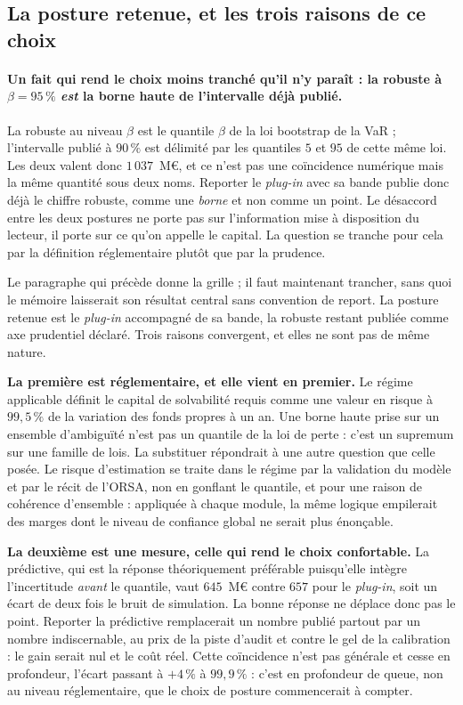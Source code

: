 \subsection*{La posture retenue, et les trois raisons de ce choix}
\label{sec:posture-retenue}


\paragraph{Un fait qui rend le choix moins tranché qu'il n'y paraît : la robuste à
$\beta=95\,\%$ \emph{est} la borne haute de l'intervalle déjà publié.} La robuste au niveau
$\beta$ est le quantile $\beta$ de la loi bootstrap de la VaR ; l'intervalle publié à $90\,\%$ est
délimité par les quantiles $5$ et $95$ de cette même loi. Les deux valent donc $1\,037$~M\euro{},
et ce n'est pas une coïncidence numérique mais la même quantité sous deux noms. Reporter le
\emph{plug-in} avec sa bande publie donc déjà le chiffre robuste, comme une \emph{borne} et non
comme un point. Le désaccord entre les deux postures ne porte pas sur l'information mise à
disposition du lecteur, il porte sur ce qu'on appelle \og le \fg{} capital. La question se tranche
pour cela par la définition réglementaire plutôt que par la prudence.

Le paragraphe qui précède donne la grille ; il faut maintenant trancher, sans quoi le mémoire
laisserait son résultat central sans convention de report. La posture retenue est le
\emph{plug-in} accompagné de sa bande, la robuste restant publiée comme axe prudentiel déclaré.
Trois raisons convergent, et elles ne sont pas de même nature.

\textbf{La première est réglementaire, et elle vient en premier.} Le régime applicable définit le
capital de solvabilité requis comme une valeur en risque à $99{,}5\,\%$ de la variation des fonds
propres à un an. Une borne haute prise sur un ensemble d'ambiguïté n'est pas un quantile de la loi
de perte : c'est un supremum sur une famille de lois. La substituer répondrait à une autre question
que celle posée. Le risque d'estimation se traite dans le régime par la validation du modèle et par
le récit de l'ORSA, non en gonflant le quantile, et pour une raison de cohérence d'ensemble :
appliquée à chaque module, la même logique empilerait des marges dont le niveau de confiance global
ne serait plus énonçable.

\textbf{La deuxième est une mesure, celle qui rend le choix confortable.} La prédictive,
qui est la réponse théoriquement préférable puisqu'elle intègre l'incertitude \emph{avant} le
quantile, vaut $645$~M\euro{} contre $657$ pour le \emph{plug-in}, soit un écart de deux fois le
bruit de simulation. La bonne réponse ne déplace donc pas le point. Reporter la
prédictive remplacerait un nombre publié partout par un nombre indiscernable, au prix de la piste
d'audit et contre le gel de la calibration : le gain serait nul et le coût réel. Cette
coïncidence n'est pas générale et cesse en profondeur, l'écart passant à $+4\,\%$ à
$99{,}9\,\%$ : c'est en profondeur de queue, non au niveau réglementaire, que le choix de posture
commencerait à compter.

